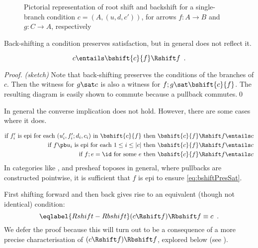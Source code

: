 \begin{figure}
\centering

\caption{Pictorial representation of root shift and backshift for a single-branch condition $c=(A,(u,d,c'))$, for arrows $f:A\to B$ and $g:C\to A$, respectively}
\end{figure}

Back-shifting a condition preserves satisfaction, but in general does not reflect it.

\begin{proposition}
\begin{equation}
    c \entails \bshift{c}{f} \Rshift f \enspace.
\end{equation}    
\end{proposition}

\begin{proof} \emph{(sketch)} Note that back-shifting preserves the conditions of the branches of $c$. Then the witness for $g \sat c$ is also a witness for $f;g \sat \bshift{c}{f}$. The resulting diagram is easily shown to commute because a pullback commutes.\qed
\end{proof}
%
In general the converse implication does not hold. However, there are some cases where it does.

\begin{align}
  \label{eq:bshiftPresSat}
  \mbox{if $f'_i$ is epi for each $(u'_i,f'_i;d_i,c_i)$ in $\bshift{c}{f}$ then } &
    \bshift{c}{f} \Rshift f \entails c \\
  \mbox{if $f\pb u_i$ is epi for each $1\leq i\leq |c|$ then } &
    \bshift{c}{f} \Rshift f \entails c \\
  \mbox{if $f;e=\id$ for some $e$ then } &
    \bshift{c}{f} \Rshift f \entails c
\end{align}
%
In categories like ,  and presheaf toposes in general, where pullbacks are constructed pointwise, it is sufficient that $f$ is epi to ensure \eqref{eq:bshiftPresSat}.

First shifting forward and then back gives rise to an equivalent (though not identical) condition:
%
\begin{equation}
\eqlabel{Rshift-Rbshift}
(c\Rshift f)\Rbshift f \equiv c \enspace.
\end{equation}
%
We defer the proof because this will turn out to be a consequence of a more precise characterisation of $(c\Rshift f)\Rbshift f$, explored below (see ).

